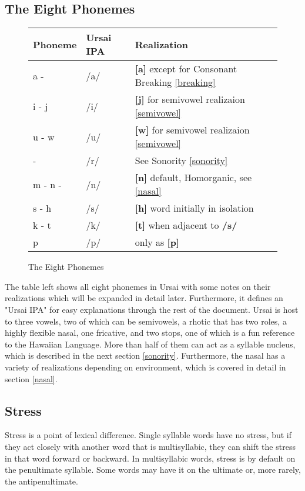\documentclass[11pt,letterpaper]{article}
\makeatletter
\newcommand{\epsi}{\textipa{E}}
\newcommand{\engma}{\textipa{N}}
\newcommand{\rson}{\textipa{@}\textrhoticity}
\newcommand{\flap}{\textipa{R}}
\makeatother
\begin{document}
	\subsection{The Eight Phonemes}
		\begin{wrapfigure}{l}{0.65\textwidth}
  			\begin{tabular}{|l|l|l|}
  				\hline
  				Phoneme             & Ursai IPA & Realization                                               \\ \hline \hline
  				a - \epsi           & /a/       & \textbf{[a]} except for Consonant Breaking \ref{breaking} \\
  				i - j               & /i/       & \textbf{[j]} for semivowel realizaion \ref{semivowel}     \\
  				u - w               & /u/       & \textbf{[w]} for semivowel realizaion \ref{semivowel}     \\
  				\flap\space - \rson & /r/       & See Sonority \ref{sonority}                               \\ 
  				m - n - \engma      & /n/       & \textbf{[n]} default, Homorganic, see \ref{nasal}         \\
  				s - h               & /s/       & \textbf{[h]} word initially in isolation                  \\
  				k - t               & /k/       & \textbf{[t]} when adjacent to \textbf{/s/}                \\
  				p                   & /p/       & only as \textbf{[p]}                                      \\ \hline
  			\end{tabular}
  			\caption{The Eight Phonemes}
		\end{wrapfigure}
		\par
		The table left shows all eight phonemes in Ursai with some notes on their realizations which will be expanded in detail later.  Furthermore, it defines an "Ursai IPA" for easy explanations through the rest of the document.  Ursai is host to three vowels, two of which can be semivowels, a rhotic that has two roles, a highly flexible nasal, one fricative, and two stops, one of which is a fun reference to the Hawaiian Language\cite{HawaiianPhonology}.  More than half of them can act as a syllable nucleus, which is described in the next section \ref{sonority}.  Furthermore, the nasal has a variety of realizations depending on environment, which is covered in detail in section \ref{nasal}.
	\subsection{Stress}\label{stress}
	\par 
	Stress is a point of lexical difference.  Single syllable words have no stress, but if they act closely with another word that is multisyllabic, they can shift the stress in that word forward or backward.  In multisyllabic words, stress is by default on the penultimate syllable.  Some words may have it on the ultimate or, more rarely, the antipenultimate.
\end{document}
